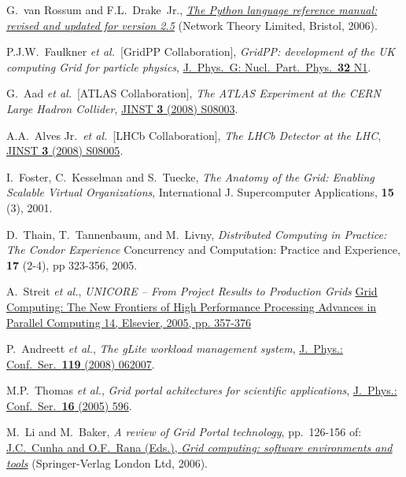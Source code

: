 \documentclass{elsart}
\def\etal {\textit{et al.}}
\begin{document}
\begin{linenumbers}
\vspace{-2ex}

\begin{thebibliography}{00}

G.~van Rossum and F.L.~Drake~Jr.,
\href{http://www.network-theory.co.uk/python/language/}
{\textit{The Python language reference manual: revised and updated for version
2.5}} (Network Theory Limited, Bristol, 2006).

P.J.W.~Faulkner \etal\ [GridPP Collaboration],
\textit{GridPP: development of the UK computing Grid for particle physics},
\href{http://dx.doi.org/10.1088/0954-3899/32/1/N01}
{J.~Phys.\ G: Nucl.\ Part.\ Phys.\ \textbf{32} N1}.

G.~Aad \etal\ [ATLAS Collaboration],
\textit{The ATLAS Experiment at the CERN Large Hadron Collider},
\href{http://dx.doi.org/10.1088/1748-0221/3/08/S08003}
{JINST {\bf 3} (2008) S08003}.


A.A.~Alves Jr.\ \etal\ [LHCb Collaboration],
\textit{The LHCb Detector at the LHC},
\href{http://dx.doi.org/10.1088/1748-0221/3/08/S08005}
{JINST {\bf 3} (2008) S08005}.


I.~Foster, C.~Kesselman and S.~Tuecke,
\textit{The Anatomy of the Grid: Enabling Scalable Virtual Organizations},
{International J. Supercomputer Applications, \textbf{15} (3), 2001.}

D.~Thain, T.~Tannenbaum, and M.~Livny, 
\textit{Distributed Computing in Practice: The Condor Experience}
{Concurrency and Computation: Practice and Experience, \textbf{17} (2-4), pp 323-356, 2005.}


A.~Streit \etal,
\textit{UNICORE -- From Project Results to Production Grids}
\href{http://www.unicore.eu}
{Grid Computing: The New Frontiers of High Performance Processing
Advances in Parallel Computing 14, Elsevier, 2005, pp. 357-376}

 P.~Andreett \etal,
\textit{The gLite workload management system},
\href{http://dx.doi.org/10.1088/1742-6596/119/6/062007}
{J.~Phys.: Conf.\ Ser.\ \textbf{119} (2008) 062007}.

 M.P.~Thomas \etal,
\textit{Grid portal achitectures for scientific applications},
\href{http://dx.doi.org/10.1088/1742-6596/16/1/083}
{J.~Phys.: Conf.\ Ser.\ \textbf{16} (2005) 596}.

 M.~Li and M.~Baker,
\textit{A review of Grid Portal technology}, pp.~126-156 of:
\href{http://www.springer.com/computer/programming/book/978-1-85233-998-2}
{J.C.~Cunha and O.F.~Rana (Eds.),
\textit{Grid computing: software environments and tools}}
(Springer-Verlag London Ltd, 2006).



\end{thebibliography}
\end{linenumbers}
\end{document}
